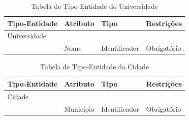 \documentclass[11pt]{../../classes/ifscarticle}
\begin{document}
\begin{table}[h]
    \centering
    \vspace{0.5cm}
    \begin{tabular}{ p{}|p{3cm}|p{4cm}|p{}|  }


        Tipo-Entidade & Atributo & Tipo          & Restrições                                                      \\ %
        \hline
        Universidade
                      &          &               &                                                                 \\
                      & Nome     & Identificador & Obrigatório                                          \linebreak \\
        \hline
    \end{tabular}
    \caption{Tabela de Tipo-Entidade do Universidade}
\end{table}


\begin{table}[h]
    \centering
    \vspace{0.5cm}
    \begin{tabular}{ p{}|p{3cm}|p{4cm}|p{}|  }


        Tipo-Entidade & Atributo  & Tipo          & Restrições                                                      \\ %
        \hline
        Cidade
                      &           &               &                                                                 \\
                      & Municipio & Identificador & Obrigatório                                          \linebreak \\
        \hline
    \end{tabular}
    \caption{Tabela de Tipo-Entidade da Cidade}
\end{table}

\clearpage
\end{document}
